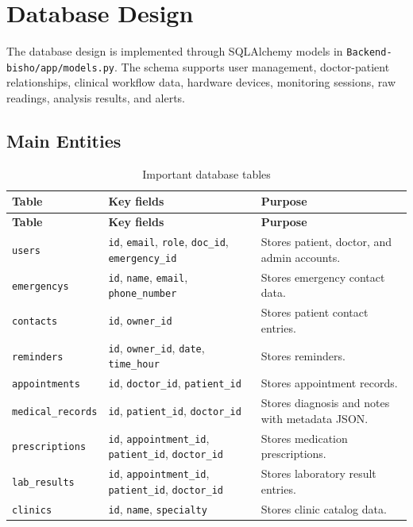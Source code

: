\chapter{Database Design}

The database design is implemented through SQLAlchemy models in \texttt{Backend-bisho/app/models.py}. The schema supports user management, doctor-patient relationships, clinical workflow data, hardware devices, monitoring sessions, raw readings, analysis results, and alerts.

\section{Main Entities}

\begin{longtable}{p{} p{} p{}}
\caption{Important database tables}\\
\toprule
\textbf{Table} & \textbf{Key fields} & \textbf{Purpose}\\
\midrule
\endfirsthead
\toprule
\textbf{Table} & \textbf{Key fields} & \textbf{Purpose}\\
\midrule
\endhead
\texttt{users} & \texttt{id}, \texttt{email}, \texttt{role}, \texttt{doc\_id}, \texttt{emergency\_id} & Stores patient, doctor, and admin accounts.\\
\texttt{emergencys} & \texttt{id}, \texttt{name}, \texttt{email}, \texttt{phone\_number} & Stores emergency contact data.\\
\texttt{contacts} & \texttt{id}, \texttt{owner\_id} & Stores patient contact entries.\\
\texttt{reminders} & \texttt{id}, \texttt{owner\_id}, \texttt{date}, \texttt{time\_hour} & Stores reminders.\\
\texttt{appointments} & \texttt{id}, \texttt{doctor\_id}, \texttt{patient\_id} & Stores appointment records.\\
\texttt{medical\_records} & \texttt{id}, \texttt{patient\_id}, \texttt{doctor\_id} & Stores diagnosis and notes with metadata JSON.\\
\texttt{prescriptions} & \texttt{id}, \texttt{appointment\_id}, \texttt{patient\_id}, \texttt{doctor\_id} & Stores medication prescriptions.\\
\texttt{lab\_results} & \texttt{id}, \texttt{appointment\_id}, \texttt{patient\_id}, \texttt{doctor\_id} & Stores laboratory result entries.\\
\texttt{clinics} & \texttt{id}, \texttt{name}, \texttt{specialty} & Stores clinic catalog data.\\

\end{longtable}
